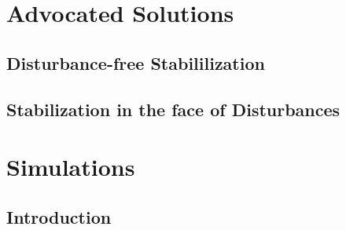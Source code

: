 \documentclass[a4paper,11pt,twoside]{book}
\begin{document}
\part{Advocated Solutions}
\label{part:advocated_solutions}
    \cleardoublepage

  \chapter{Disturbance-free Stabililization}
    \label{chapter:stabilization_without_disturbance}

    
    
    
    
    \cleardoublepage

  \chapter{Stabilization in the face of Disturbances}
    \label{chapter:stabilization_with_disturbance}

    
    
    
    
    \cleardoublepage


\part{Simulations}

  \chapter{Introduction}
    \label{chapter:simulations_introduction}
\end{document}
